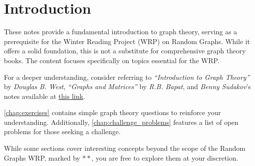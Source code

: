 \documentclass[../basic_graph_theory.tex]{subfiles}
\begin{document}
\setcounter{chapter}{-1}
\chapter{Introduction}
\setcounter{chapter}{0} %
\setcounter{section}{0}
\setcounter{equation}{0}
\setcounter{figure}{0}

These notes provide a fundamental introduction to graph theory, serving as a prerequisite for the Winter Reading Project (WRP) on Random Graphs. While it offers a solid foundation, this is not a substitute for comprehensive graph theory books. The content focuses specifically on topics essential for the WRP.

For a deeper understanding, consider referring to \textit{``Introduction to Graph Theory''} by \textit{Douglas B. West}, \textit{``Graphs and Matrices''} by \textit{R.B. Bapat}, and \textit{Benny Sudakov}'s notes available at \href{https://www2.math.ethz.ch/education/bachelor/lectures/fs2016/math/graph_theory/graph_theory_notes.pdf}{this link}.

\autoref{chap:exercises} contains simple graph theory questions to reinforce your understanding. Additionally, \autoref{chap:challenge_problems} features a list of open problems for those seeking a challenge.

While some sections cover interesting concepts beyond the scope of the Random Graphs WRP, marked by $**$, you are free to explore them at your discretion.
\end{document}
